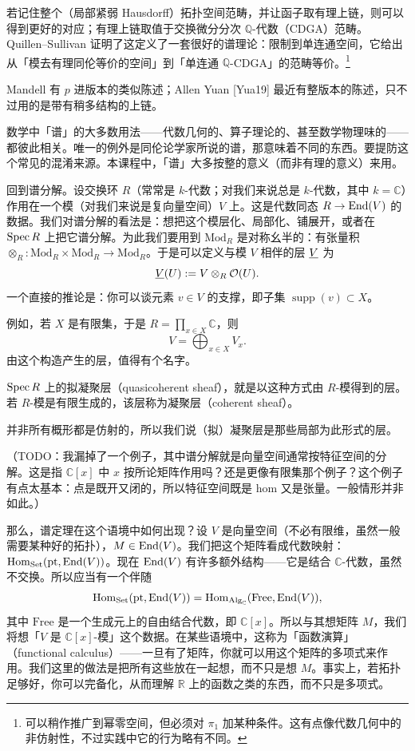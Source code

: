 若记住整个（局部紧弱 Hausdorff）拓扑空间范畴，并让函子取有理上链，则可以得到更好的对应；有理上链取值于交换微分分次 $\mathbb{Q}$-代数（CDGA）范畴。Quillen–Sullivan 证明了这定义了一套很好的谱理论：限制到单连通空间，它给出从「模去有理同伦等价的空间」到「单连通 $\mathbb{Q}$-CDGA」的范畴等价。\footnote{可以稍作推广到幂零空间，但必须对 $\pi_1$ 加某种条件。这有点像代数几何中的非仿射性，不过实践中它的行为略有不同。}

Mandell 有 $p$ 进版本的类似陈述；Allen Yuan [Yua19] 最近有整版本的陈述，只不过用的是带有稍多结构的上链。

\begin{remark}
数学中「谱」的大多数用法——代数几何的、算子理论的、甚至数学物理味的——都彼此相关。唯一的例外是同伦论学家所说的谱，那意味着不同的东西。要提防这个常见的混淆来源。本课程中，「谱」大多按整的意义（而非有理的意义）来用。
\end{remark}


回到谱分解。设交换环 $R$（常常是 $k$-代数；对我们来说总是 $k$-代数，其中 $k=\mathbb{C}$）作用在一个模（对我们来说是复向量空间）$V$ 上。这是代数同态 $R\to\operatorname{End}(V)$ 的数据。我们对谱分解的看法是：想把这个模层化、局部化、铺展开，或者在 $\operatorname{Spec} R$ 上把它谱分解。为此我们要用到 $\mathrm{Mod}_R$ 是对称幺半的：有张量积 $\otimes_R:\mathrm{Mod}_R\times\mathrm{Mod}_R\to\mathrm{Mod}_R$。于是可以定义与模 $V$ 相伴的层 $\underline{V}$ 为
\[
\underline{V}(U) := V\otimes_R\mathcal{O}(U).
\]
一个直接的推论是：你可以谈元素 $v\in V$ 的支撑，即子集 $\operatorname{supp}(v)\subset X$。

例如，若 $X$ 是有限集，于是 $R=\prod_{x\in X}\mathbb{C}$，则
\[
V=\bigoplus_{x\in X}V_x.
\]
由这个构造产生的层，值得有个名字。

\begin{definition}
$\operatorname{Spec} R$ 上的拟凝聚层（quasicoherent sheaf），就是以这种方式由 $R$-模得到的层。若 $R$-模是有限生成的，该层称为凝聚层（coherent sheaf）。
\end{definition}

并非所有概形都是仿射的，所以我们说（拟）凝聚层是那些局部为此形式的层。

（TODO：我漏掉了一个例子，其中谱分解就是向量空间通常按特征空间的分解。这是指 $\mathbb{C}[x]$ 中 $x$ 按所论矩阵作用吗？还是更像有限集那个例子？这个例子有点太基本：点是既开又闭的，所以特征空间既是 hom 又是张量。一般情形并非如此。）

那么，谱定理在这个语境中如何出现？设 $V$ 是向量空间（不必有限维，虽然一般需要某种好的拓扑），$M\in\operatorname{End}(V)$。我们把这个矩阵看成代数映射：$\operatorname{Hom}_{\mathrm{Set}}(\mathrm{pt},\operatorname{End}(V))$。现在 $\operatorname{End}(V)$ 有许多额外结构——它是结合 $\mathbb{C}$-代数，虽然不交换。所以应当有一个伴随
\[
\operatorname{Hom}_{\mathrm{Set}}(\mathrm{pt},\operatorname{End}(V))=\operatorname{Hom}_{\mathrm{Alg}_{\mathbb{C}}}(\mathrm{Free},\operatorname{End}(V)),
\]
其中 $\mathrm{Free}$ 是一个生成元上的自由结合代数，即 $\mathbb{C}[x]$。所以与其想矩阵 $M$，我们将想「$V$ 是 $\mathbb{C}[x]$-模」这个数据。在某些语境中，这称为「函数演算」（functional calculus）——一旦有了矩阵，你就可以用这个矩阵的多项式来作用。我们这里的做法是把所有这些放在一起想，而不只是想 $M$。事实上，若拓扑足够好，你可以完备化，从而理解 $\mathbb{R}$ 上的函数之类的东西，而不只是多项式。

